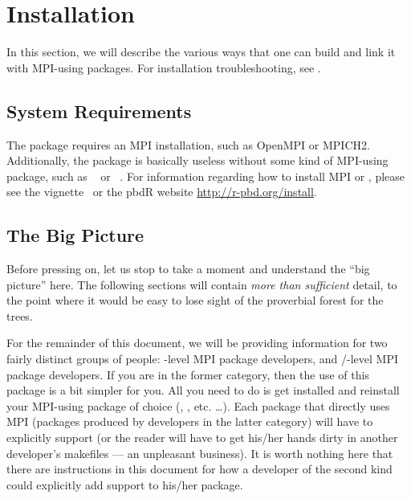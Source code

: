 \section{Installation}
\label{sec:installation}

In this section, we will describe the various ways that one can build  and link it with MPI-using  packages.  For installation troubleshooting, see \instdebug.


\subsection[System Requirements]{System Requirements}
\label{sec:system_requirements}

The  package requires an MPI installation, such as OpenMPI or 
MPICH2.  Additionally, the package is basically useless without some kind of 
MPI-using  package, such 
as ~\citep{Chen2012pbdMPIpackage} or ~\citep{Yu2002}.
For information regarding how to install MPI or , please see the 
 vignette~\citep{Chen2012pbdMPIvignette} or the pbdR website 
\url{http://r-pbd.org/install}.


\subsection{The Big Picture}

Before pressing on, let us stop to take a moment and understand the ``big 
picture'' here. The following sections will contain \emph{more than sufficient} 
detail, to the point where it would be easy to lose sight of the proverbial 
forest for the trees.

For the remainder of this document, we will be providing information for two 
fairly distinct groups of people:  -level MPI package developers, 
and /-level MPI package developers.  If you are 
in the former category, then the use of this package is a bit simpler for you.  
All you need to do is get  installed and reinstall your MPI-using 
package of choice (, , etc. \dots).  Each package that 
directly uses MPI (packages produced by developers in the latter category) will 
have to explicitly support  (or the reader will have to get 
his/her hands dirty in another developer's makefiles --- an unpleasant 
business).  It is worth nothing here that there are instructions in this 
document for how a developer of the second kind could explicitly add 
 support to his/her package.
  
